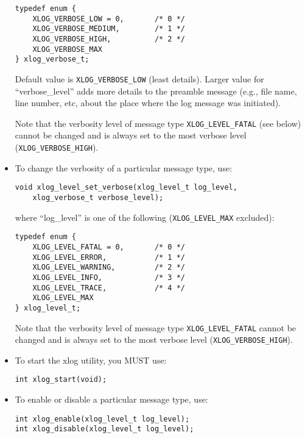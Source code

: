 \documentclass[11pt]{article}
\begin{document}
\begin{itemize}
\begin{verbatim}
typedef enum {
    XLOG_VERBOSE_LOW = 0,       /* 0 */
    XLOG_VERBOSE_MEDIUM,        /* 1 */
    XLOG_VERBOSE_HIGH,          /* 2 */
    XLOG_VERBOSE_MAX
} xlog_verbose_t;
\end{verbatim}

   Default value is \verb=XLOG_VERBOSE_LOW= (least details).
   Larger value for ``verbose\_level'' adds more details to the
   preamble message (e.g., file name, line number, etc, about the place
   where the log message was initiated).

   Note that the verbosity level of message type \verb=XLOG_LEVEL_FATAL= (see
   below) cannot be changed and is always set to the most verbose level
   (\verb=XLOG_VERBOSE_HIGH=).

  \item To change the verbosity of a particular message type, use:

\begin{verbatim}
void xlog_level_set_verbose(xlog_level_t log_level,
	xlog_verbose_t verbose_level);
\end{verbatim}

where ``log\_level'' is one of the following (\verb=XLOG_LEVEL_MAX=
excluded):

\begin{verbatim}
typedef enum {
    XLOG_LEVEL_FATAL = 0,       /* 0 */
    XLOG_LEVEL_ERROR,           /* 1 */
    XLOG_LEVEL_WARNING,         /* 2 */
    XLOG_LEVEL_INFO,            /* 3 */
    XLOG_LEVEL_TRACE,           /* 4 */
    XLOG_LEVEL_MAX
} xlog_level_t;
\end{verbatim}

   Note that the verbosity level of message type \verb=XLOG_LEVEL_FATAL=
   cannot be changed and is always set to the most verbose level
   (\verb=XLOG_VERBOSE_HIGH=).

  \item To start the xlog utility, you MUST use:

\begin{verbatim}
int xlog_start(void);
\end{verbatim}


  \item To enable or disable a particular message type, use:

\begin{verbatim}
int xlog_enable(xlog_level_t log_level);
int xlog_disable(xlog_level_t log_level);
\end{verbatim}


\end{itemize}
\end{document}
